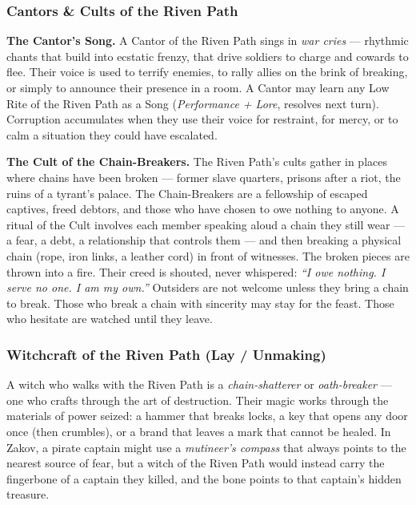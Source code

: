 \subsubsection*{Cantors \& Cults of the Riven Path}

\textbf{The Cantor's Song.} A Cantor of the Riven Path sings in \textit{war cries} --- rhythmic chants that build into ecstatic frenzy, that drive soldiers to charge and cowards to flee. Their voice is used to terrify enemies, to rally allies on the brink of breaking, or simply to announce their presence in a room. A Cantor may learn any Low Rite of the Riven Path as a Song (\textit{Performance + Lore}, resolves next turn). Corruption accumulates when they use their voice for restraint, for mercy, or to calm a situation they could have escalated.

\textbf{The Cult of the Chain-Breakers.} The Riven Path's cults gather in places where chains have been broken --- former slave quarters, prisons after a riot, the ruins of a tyrant's palace. The Chain-Breakers are a fellowship of escaped captives, freed debtors, and those who have chosen to owe nothing to anyone. A ritual of the Cult involves each member speaking aloud a chain they still wear --- a fear, a debt, a relationship that controls them --- and then breaking a physical chain (rope, iron links, a leather cord) in front of witnesses. The broken pieces are thrown into a fire. Their creed is shouted, never whispered: \textit{``I owe nothing. I serve no one. I am my own.''} Outsiders are not welcome unless they bring a chain to break. Those who break a chain with sincerity may stay for the feast. Those who hesitate are watched until they leave.

\subsubsection*{Witchcraft of the Riven Path (Lay / Unmaking)}

A witch who walks with the Riven Path is a \textit{chain-shatterer} or \textit{oath-breaker} --- one who crafts through the art of destruction. Their magic works through the materials of power seized: a hammer that breaks locks, a key that opens any door once (then crumbles), or a brand that leaves a mark that cannot be healed. In Zakov, a pirate captain might use a \textit{mutineer's compass} that always points to the nearest source of fear, but a witch of the Riven Path would instead carry the fingerbone of a captain they killed, and the bone points to that captain's hidden treasure.

